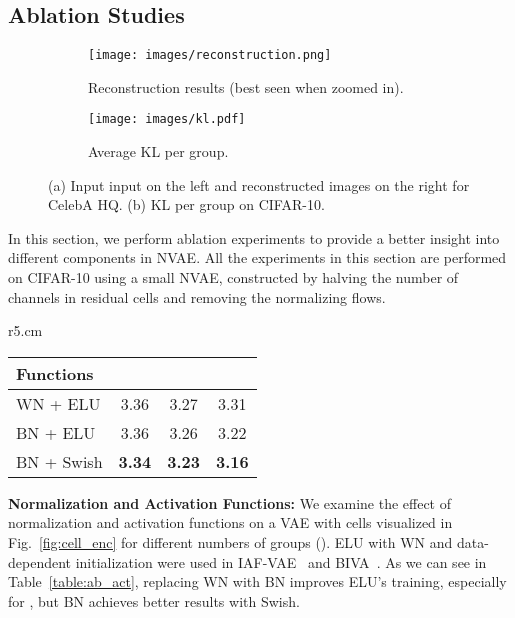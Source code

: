 \documentclass{article}
\begin{document}
\subsection{Ablation Studies}\label{sec:ab_res}
\begin{figure}[t]
\vspace{-0.5cm}
\centering
\begin{subfigure}[b]{.49\textwidth}
\centering
    \setlength{\belowcaptionskip}{1pt}
    \vspace{-0.6cm}
    \texttt{[image: images/reconstruction.png]}
    \caption{Reconstruction results (best seen when zoomed in).}
    \label{fig:recon_hq}
\end{subfigure}
\begin{subfigure}[b]{.49\textwidth}
\centering
    \setlength{\belowcaptionskip}{1pt}
    \vspace{-0.6cm}
    \texttt{[image: images/kl.pdf]}
    \caption{Average KL per group.}
    \label{fig:kl_groups}
\end{subfigure}
\caption{(a) Input input on the left and reconstructed images on the right for CelebA HQ. (b) KL per group on CIFAR-10.}
\label{fig:recon_kl}
\end{figure} 
In this section, we perform ablation experiments to provide a better insight into different components in NVAE. All the experiments in this section are performed on CIFAR-10 using a small NVAE, constructed by halving the number of channels in residual cells and removing the normalizing flows.

\begin{wraptable}{r}{5.cm}
\vspace{-4mm}
\centering
{\footnotesize
\setlength{\tabcolsep}{2pt}
\caption{\small Normalization \& activation}\label{table:ab_act}
    \begin{tabular}{lccc}
    \toprule
    Functions    &  &  &  \\
    \midrule
    WN + ELU     & 3.36  & 3.27  & 3.31  \\
    BN + ELU     & 3.36  & 3.26  & 3.22  \\
    BN + Swish   & \bf 3.34  & \bf 3.23  & \bf 3.16  \\
    \bottomrule
    \end{tabular}}
\vspace{-4mm}
\end{wraptable}
\textbf{Normalization and Activation Functions:} We examine the effect of normalization and activation functions on a VAE with cells visualized in Fig.~\ref{fig:cell_enc} for different numbers of groups (). ELU with WN and data-dependent initialization were used in IAF-VAE~\cite{kingma2016improved} and BIVA~\cite{maaloe2019biva}. As we can see in Table~\ref{table:ab_act}, replacing WN with BN improves ELU's training, especially for , but BN achieves better results with Swish. 
\end{document}
